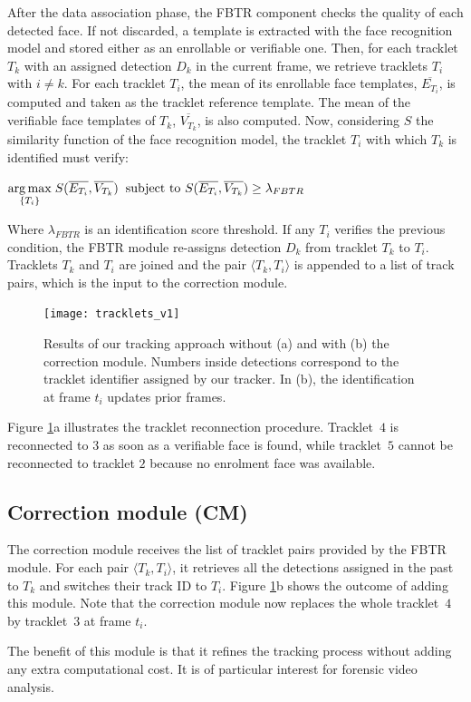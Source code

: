 After the data association phase, the FBTR component checks the quality of each detected face. If not discarded, a template is extracted with the face recognition model and stored either as an enrollable or verifiable one. Then, for each tracklet $T_k$ with an assigned detection $D_k$ in the current frame, we retrieve tracklets $T_i$ with $i\neq k$. For each tracklet $T_i$, the mean of its enrollable face templates, $\overline{E_{T_i}}$, is computed and taken as the tracklet reference template. The mean of the verifiable face templates of $T_k$, $\overline{V_{T_k}}$, is also computed. Now, considering $S$ the similarity function of the face recognition model, the tracklet $T_i$ with which $T_k$ is identified must verify:

\vspace{2mm}

$\underset{{\{T_i\}}}{\arg\max}\hspace{1mm}S(\overline{E_{T_i}}, \overline{V_{T_k}})\hspace{2mm}\text{subject to}\hspace{1.2mm} 
 S(\overline{E_{T_i}}, \overline{V_{T_k}})\geq \lambda_{FBTR}$
 
 \vspace{3mm}
 
\noindent Where $\lambda_{FBTR}$ is an identification score threshold. If any $T_i$ verifies the previous condition, the FBTR module re-assigns detection $D_k$ from tracklet $T_k$ to $T_i$. Tracklets $T_k$ and $T_i$ are joined and the pair $\langle T_k, T_i\rangle$ is appended to a list of track pairs, which is the input to the correction module.


\begin{figure}[t]
\texttt{[image: tracklets\_v1]}

\caption{Results of our tracking approach without (a) and with (b) the correction module. Numbers inside detections correspond to the tracklet identifier assigned by our tracker. In (b), the identification at frame $t_{i}$ updates prior frames.}
\label{fig:reid_tracklets}
\end{figure}

Figure \ref{fig:reid_tracklets}a illustrates the tracklet reconnection procedure. Tracklet~$4$ is reconnected to $3$ as soon as a verifiable face is found, while tracklet~$5$ cannot be reconnected to tracklet $2$ because no enrolment face was available.


\subsection{Correction module (CM)}

The correction module receives the list of tracklet pairs provided by the FBTR module. For each pair $\langle T_k, T_i\rangle$, it retrieves all the detections assigned in the past to $T_k$ and switches their track ID to $T_i$. Figure \ref{fig:reid_tracklets}b shows the outcome of adding this module. Note that the correction module now replaces the whole tracklet~$4$ by tracklet~$3$ at frame $t_i$.

The benefit of this module is that it refines the tracking process without adding any extra computational cost. It is of particular interest for forensic video analysis.


